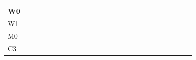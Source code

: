 \documentclass[journal,onecolumn]{IEEEtran}
\begin{document}
\begin{table}[ht]
\begin{tabular}{|l|llllll|llllll|llllll|llllll|}
W0   &                          &                          &                          &                          &                          &                          &                          &                          &                          &                          & \cellcolor[HTML]{414868} & \cellcolor[HTML]{414868} &                          &                          &                          &                          &                          &                          &                          &                          &                          &                          &                          &  \\ \hline
W1   &                          &                          &                          &                          &                          &                          &                          &                          &                          &                          & \cellcolor[HTML]{414868} & \cellcolor[HTML]{414868} &                          &                          &                          &                          &                          &                          &                          &                          &                          &                          &                          &  \\ \hline
M0   &                          &                          &                          &                          &                          &                          &                          &                          &                          &                          &                          & \cellcolor[HTML]{7AA2F7} &                          &                          &                          &                          &                          &                          &                          &                          &                          &                          &                          &  \\ \hline
C3   &                          &                          &                          &                          &                          &                          &                          &                          &                          &                          &                          &                          & \cellcolor[HTML]{414868} & \cellcolor[HTML]{414868} &                          &                          &                          &                          &                          &                          &                          &                          &                          &  \\ \hline

\end{tabular}
\end{table}
\end{document}
